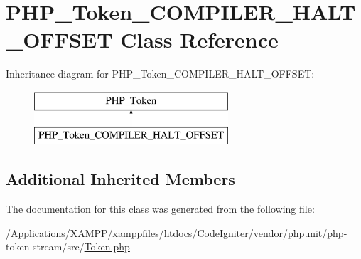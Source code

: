 \hypertarget{class_p_h_p___token___c_o_m_p_i_l_e_r___h_a_l_t___o_f_f_s_e_t}{}\section{P\+H\+P\+\_\+\+Token\+\_\+\+C\+O\+M\+P\+I\+L\+E\+R\+\_\+\+H\+A\+L\+T\+\_\+\+O\+F\+F\+S\+ET Class Reference}
\label{class_p_h_p___token___c_o_m_p_i_l_e_r___h_a_l_t___o_f_f_s_e_t}
Inheritance diagram for P\+H\+P\+\_\+\+Token\+\_\+\+C\+O\+M\+P\+I\+L\+E\+R\+\_\+\+H\+A\+L\+T\+\_\+\+O\+F\+F\+S\+ET\+:\begin{figure}[H]
\begin{center}
\leavevmode
\includegraphics[height=2.000000cm]{class_p_h_p___token___c_o_m_p_i_l_e_r___h_a_l_t___o_f_f_s_e_t}
\end{center}
\end{figure}
\subsection*{Additional Inherited Members}


The documentation for this class was generated from the following file\+:\begin{DoxyCompactItemize}
\item 
/\+Applications/\+X\+A\+M\+P\+P/xamppfiles/htdocs/\+Code\+Igniter/vendor/phpunit/php-\/token-\/stream/src/\mbox{\hyperlink{_token_8php}{Token.\+php}}\end{DoxyCompactItemize}

